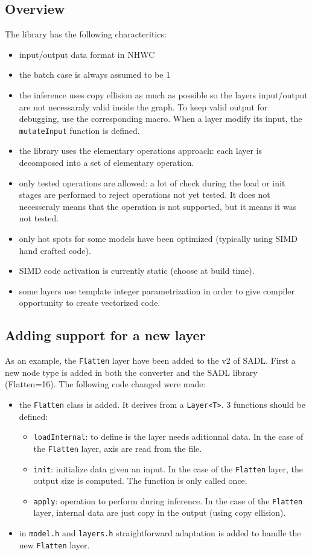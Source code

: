 \documentclass[10pt,a4paper]{article}
\begin{document}
\subsection{Overview}
The library has the following characteritics:
\begin{itemize}
\item input/output data format in NHWC
\item the batch case is always assumed to be 1
\item the inference uses copy ellision as much as possible so the layers input/output are not necessaraly valid inside the graph. To keep valid output for debugging, use the corresponding macro. When a layer modify its input, the \texttt{mutateInput} function is defined.
\item the library uses the elementary operations approach: each layer is decomposed into a set of elementary operation.
\item only tested operations are allowed: a lot of check during the load or init stages are performed to reject operations not yet tested. It does not necesseraly means that the operation is not supported, but it means it was not tested.
\item only hot spots for some models have been optimized (typically using SIMD hand crafted code). 
\item SIMD code activation is currently static (choose at build time).
\item some layers use template integer parametrization in order to give compiler opportunity to create vectorized code.
\end{itemize}

\subsection{Adding support for a new layer}
As an example, the \texttt{Flatten} layer have been added to the v2 of SADL. First a new node type is added in both the converter and the SADL library (\textrm{Flatten=16}).
The following code changed were made:
\begin{itemize}
\item the \texttt{Flatten} class is added. It derives from a \texttt{Layer<T>}. 3 functions should be defined:
\begin{itemize}
\item \texttt{loadInternal}: to define is the layer needs aditionnal data. In the case of the \texttt{Flatten} layer, axis are read from the file.
\item \texttt{init}: initialize data given an input. In the case of the \texttt{Flatten} layer, the output size is computed. The function is only called once.
\item \texttt{apply}: operation to perform during inference. In the case of the \texttt{Flatten} layer, internal data are just copy in the output (using copy ellision). 
\end{itemize}
\item in  \texttt{model.h} and  \texttt{layers.h} straightforward adaptation is added to handle the new \texttt{Flatten} layer.
\end{itemize}
\end{document}
